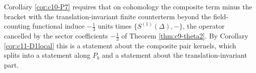 Corollary \ref{cor:c10-P7} requires that on cohomology the composite term minus the bracket with the translation-invariant finite counterterm beyond the field-counting functional induce $-\tfrac13$ units times $\{S^{(1)}(\Delta),-\}$, the operator cancelled by the sector coefficients $-\tfrac13$ of Theorem \ref{thm:c9-theta2}. By Corollary \ref{cor:c11-D1local} this is a statement about the composite pair kernels, which splits into a statement along $P_b$ and a statement about the translation-invariant part.
